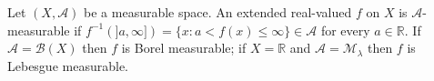 Let $(X, \mathcal{A})$ be a measurable space. An extended real-valued $f$ on $X$ is $\mathcal{A}$-measurable if $f^{-1}(]a, \infty]) = \{x : a < f(x) \leq \infty\} \in \mathcal{A}$ for every $a \in \mathbb{R}$. If $\mathcal{A} = \mathcal{B}(X)$ then $f$ is Borel measurable; if $X = \mathbb{R}$ and $\mathcal{A} = \mathcal{M}_\lambda$ then $f$ is Lebesgue measurable.